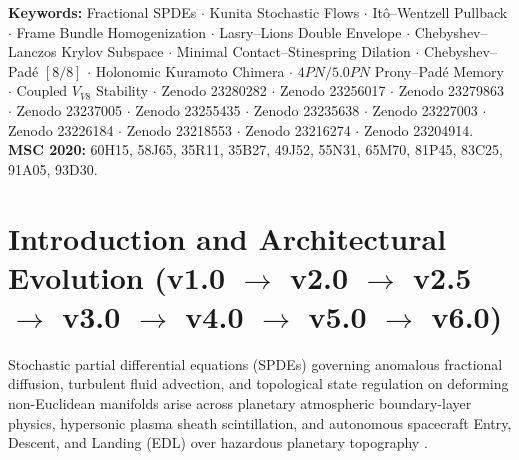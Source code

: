 \documentclass[11pt,a4paper,reqno]{article}
\def\mathrm#1{#1}%
\def\mathcal#1{#1}%
\theoremstyle{plain}
\theoremstyle{definition}
\theoremstyle{remark}
\numberwithin{equation}{section}
\begin{document}
\vspace{0.6ex}
\noindent\textbf{Keywords:} Fractional SPDEs $\cdot$ Kunita Stochastic Flows $\cdot$ It\^o--Wentzell Pullback $\cdot$ Frame Bundle Homogenization $\cdot$ Lasry--Lions Double Envelope $\cdot$ Chebyshev--Lanczos Krylov Subspace $\cdot$ Minimal Contact--Stinespring Dilation $\cdot$ Chebyshev--Pad\'e $[8/8]$ $\cdot$ Holonomic Kuramoto Chimera $\cdot$ $4\mathrm{PN}/5.0\mathrm{PN}$ Prony--Pad\'e Memory $\cdot$ Coupled $\mathcal{V}_{\mathrm{V8}}$ Stability $\cdot$ Zenodo 23280282 $\cdot$ Zenodo 23256017 $\cdot$ Zenodo 23279863 $\cdot$ Zenodo 23237005 $\cdot$ Zenodo 23255435 $\cdot$ Zenodo 23235638 $\cdot$ Zenodo 23227003 $\cdot$ Zenodo 23226184 $\cdot$ Zenodo 23218553 $\cdot$ Zenodo 23216274 $\cdot$ Zenodo 23204914.\\[0.3ex]
\noindent\textbf{MSC 2020:} 60H15, 58J65, 35R11, 35B27, 49J52, 55N31, 65M70, 81P45, 83C25, 91A05, 93D30.

\clearpage
\tableofcontents
\clearpage

\section{Introduction and Architectural Evolution (v1.0 \texorpdfstring{$\to$}{->} v2.0 \texorpdfstring{$\to$}{->} v2.5 \texorpdfstring{$\to$}{->} v3.0 \texorpdfstring{$\to$}{->} v4.0 \texorpdfstring{$\to$}{->} v5.0 \texorpdfstring{$\to$}{->} v6.0)}
\label{sec:intro}

Stochastic partial differential equations (SPDEs) governing anomalous fractional diffusion, turbulent fluid advection, and topological state regulation on deforming non-Euclidean manifolds arise across planetary atmospheric boundary-layer physics, hypersonic plasma sheath scintillation, and autonomous spacecraft Entry, Descent, and Landing (EDL) over hazardous planetary topography \cite{ananda2026spde_v40, ananda2026spde_v30, ananda2026spde_v25, ananda2026stochastic_fluid_v2, ghulame2026spde_v1, daPrato2014stochastic, kunita1990stochastic}.
\end{document}
